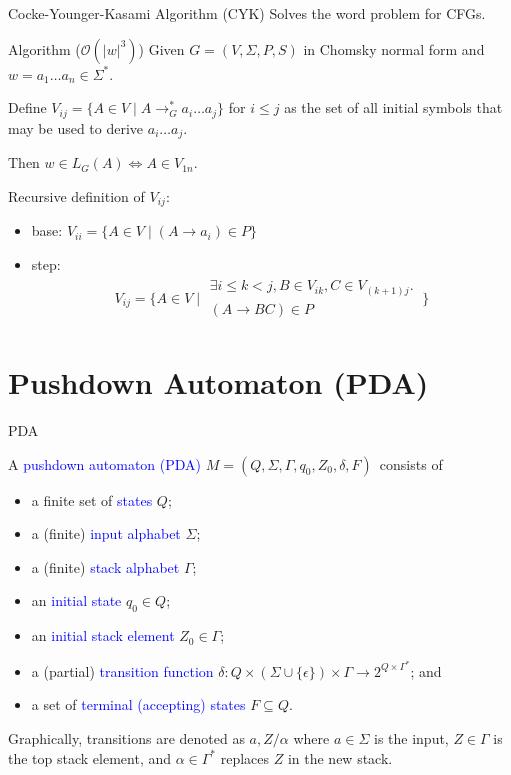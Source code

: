 \documentclass{beamer}
\def\spadding{\vspace{0.25cm}}
\def\b{\textcolor{blue}}
\begin{document}
\begin{frame}{Cocke-Younger-Kasami Algorithm (CYK)}
    Solves the word problem for CFGs.\pause

    \begin{block}{Algorithm ($\mathcal{O}(|w|^3)$)}
        Given $G = (V, \Sigma, P, S)$ in Chomsky normal form and $w = a_1 \dots a_n \in \Sigma^*$.\pause\par
        Define $V_{ij} = \{A \in V \mid A \to_G^* a_i \dots a_j\}$ for $i \leq j$ as the set of all initial symbols that may be used to derive $a_i \dots a_j$.\pause\par
        Then $w \in L_G(A) \iff A \in V_{1n}$.\pause\par\spadding
        Recursive definition of $V_{ij}$:
        \begin{itemize}
            \item base: $V_{ii} = \{A \in V \mid (A \to a_i) \in P\}$\pause
            \item step: \begin{align*}
                V_{ij} = \{A \in V \mid \substack{\exists i \leq k < j, B \in V_{ik}, C \in V_{(k+1)j}.\ \\ (A \to BC) \in P}\}
            \end{align*}
        \end{itemize}
    \end{block}
\end{frame}

\section{Pushdown Automaton (PDA)}

\begin{frame}{PDA}
    \begin{definition}
        A \b{pushdown automaton (PDA)} $M = (Q, \Sigma, \Gamma, q_0, Z_0, \delta, F)$\pause\ consists of
        \begin{itemize}
            \item a finite set of \b{states} $Q$\pause;
            \item a (finite) \b{input alphabet} $\Sigma$\pause;
            \item a (finite) \b{stack alphabet} $\Gamma$\pause;
            \item an \b{initial state} $q_0 \in Q$\pause;
            \item an \b{initial stack element} $Z_0 \in \Gamma$\pause;
            \item a (partial) \b{transition function} $\delta: Q \times (\Sigma \cup \{\epsilon\}) \times \Gamma \to 2^{Q \times \Gamma^*}$\pause; and
            \item a set of \b{terminal (accepting) states} $F \subseteq Q$.
        \end{itemize}
    \end{definition}\pause
    Graphically, transitions are denoted as $a, Z/\alpha$ where $a \in \Sigma$ is the input, $Z \in \Gamma$ is the top stack element, and $\alpha \in \Gamma^*$ replaces $Z$ in the new stack.
\end{frame}
\end{document}

